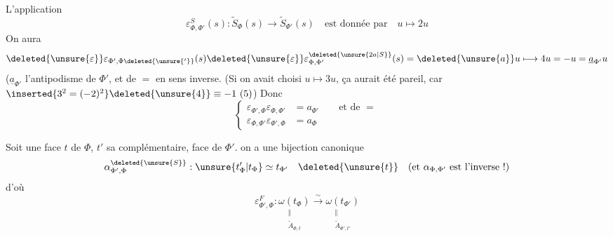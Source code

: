 L'application
\[
\varepsilon^S_{\Phi,\Phi'}(s):\widetilde S_\Phi(s)\longrightarrow\widetilde S_{\Phi'}(s)
\quad\text{est donnée par}\quad
u\longmapsto 2u
\]
On aura
\[
\deleted{\unsure{\varepsilon}}\varepsilon_{\Phi',\Phi\deleted{\unsure{'}}}(s)
\deleted{\unsure{\varepsilon}}\varepsilon^{\deleted{\unsure{2a|S}}}_{\Phi,\Phi'}(s)
=\deleted{\unsure{a}}u\longmapsto4u=-u=\underline a_{\Phi'}u
\]
($\underline a_{\Phi'}$ l'antipodisme de $\Phi'$,
et de $=$ en sens inverse. (Si on avait choisi
$u\mapsto3u$, ça aurait été pareil, car
$\inserted{3^2=(-2)^2}\deleted{\unsure{4}}\equiv-1\ (5)$)
 Donc
\[
\left\{\begin{aligned}
\varepsilon_{\Phi',\Phi}\varepsilon_{\Phi,\Phi'}&=a_{\Phi'}\qquad\text{et de }=\\
\varepsilon_{\Phi,\Phi'}\varepsilon_{\Phi',\Phi}&=a_\Phi
\end{aligned}\right.
\tag*{(1)}
\]

Soit une face $t$ de $\Phi$, $t'$ sa complémentaire, face de $\Phi'$.
on a une bijection canonique
\[
\alpha^{\deleted{\unsure{S}}}_{\Phi',\Phi}:\unsure{t'_\Phi|t_\Phi}\simeq t_{\Phi'}\quad \deleted{\unsure{t}}\quad
\text{(et $\alpha_{\Phi,\Phi'}$ est l'inverse !)}
\]
d'où
\[
\varepsilon^F_{\Phi',\Phi}:
\underset{\substack{\Vert\\\widetilde A_{\Phi,t}}}{\omega(t_\Phi)}
\xrightarrow{\sim}\underset{\substack{\Vert\\\widetilde A_{\Phi',t'}}}{\omega(t_{\Phi'})}
\]
